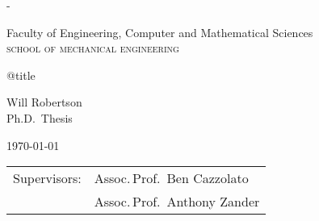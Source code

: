 
\pagestyle{empty}
\label{titlepage}
\calccentering{\unitlength}
\begin{adjustwidth*}{\unitlength}{-\unitlength}
\setlength{\parindent}{0pt}

\begin{flushright}
\end{flushright}

\vfill

Faculty of Engineering,
Computer and Mathematical Sciences\\
\textsc{school of mechanical engineering}

\vfill

{\Large\raggedright\csname @title\endcsname}

\vspace{10mm}

Will Robertson\\
Ph.D.\ Thesis
\vspace{10mm}

\today

\vfill

\vfill

\begin{tabular}{@{}ll}
Supervisors:    & Assoc.\,Prof.\ Ben Cazzolato  \\
                & Assoc.\,Prof.\ Anthony Zander
\end{tabular}
\end{adjustwidth*}

